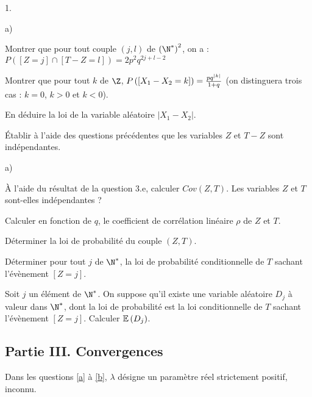 \documentclass[11pt]{article}%
\begin{document}
\begin{noliste}{1.}
\begin{noliste}{a)}
\item Montrer que pour tout couple $\left( j,l\right) $ de $\left(
\N^{\ast}\right) ^{2}$, on a : $P\left( \left[ Z = j\right] \cap\left[
T-Z = l\right] \right) = 2p^{2}q^{2j + l-2}$

\item Montrer que pour tout $k$ de $\Z$, $P\left(\left[ {
X_{1}-X_{2} = k} \right]\right) = \frac{pq^{\left| k\right| }}{1 + q}$ (on
distinguera trois cas : $k = 0$, $k>0$ et $k<0$).

\item En déduire la loi de la variable aléatoire $\left|
X_{1}-X_{2}\right| $.

\item Établir à l'aide des questions précédentes que les
variables $Z$ et $T-Z$ sont indépendantes.
\end{noliste}

\item 

\begin{noliste}{a)}
 \setlength{\itemsep}{2mm}
\item À l'aide du résultat de la question 3.e, calculer $Cov\left(
Z,T\right) $. Les variables $Z$ et $T$ sont-elles indépendantes ?

\item Calculer en fonction de $q$, le coefficient de corrélation
linéaire $\rho $ de $Z$ et $T$.

\item Déterminer la loi de probabilité du couple $\left( Z,T\right) $.

\item Déterminer pour tout $j$ de $\N^{\ast }$, la loi de
probabilité conditionnelle de $T$ sachant l'évènement $\left[ Z =
j\right] $.

\item Soit $j$ un élément de $\N^{\ast }$. On suppose qu'il
existe une variable aléatoire $D_{j}$ à valeur dans $\N^{\ast }$, dont
la loi de probabilité est la loi conditionnelle de $T$
sachant l'évènement $\left[ Z = j\right] $. Calculer $\mathbb{E}\left(
D_{j}\right) $.
\end{noliste}
\end{noliste}

\subsection*{Partie III. Convergences}

Dans les questions \ref{a} à \ref{b}, $\lambda $ désigne un paramètre
réel strictement positif, inconnu.
\end{document}
